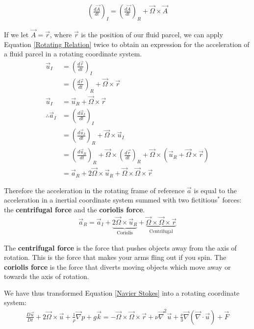 \begin{align}
    \left(\frac{d\vec{A}}{dt}\right)_I=\left(\frac{d\vec{A}}{dt}\right)_R+\vec{\Omega}\times\vec{A}
    \label{Rotating Relation}
\end{align}

If we let $\vec{A}=\vec{r}$, where $\vec{r}$ is the position of our fluid parcel, we can apply Equation \ref{Rotating Relation} twice to obtain an expression for the acceleration of a fluid parcel in a rotating coordinate system.
\begin{align*}
    \vec{u}_I &= \left( \frac{d\vec{r}}{dt} \right)_I\\
    &= \left( \frac{d\vec{r}}{dt} \right)_R+\vec{\Omega}\times \vec{r}\\
    \vec{u}_I & = \vec{u}_R+\vec{\Omega}\times \vec{r}\\
    \therefore \vec{a}_I & =
    \left( \frac{d\vec{u}_I}{dt} \right)_I\\
    &= \left( \frac{d\vec{u}_I}{dt} \right)_R+\vec{\Omega}\times \vec{u}_I\\
    &= \left( \frac{d\vec{u}_R}{dt} \right)_R
    +\vec{\Omega}\times\left( \frac{d\vec{r}}{dt} \right)_R
    +\vec{\Omega}\times\left( 
        \vec{u}_R+\vec{\Omega}\times \vec{r}
     \right)\\
    &=\vec{a}_R+2\vec{\Omega}\times\vec{u}_R+\vec{\Omega}\times\vec{\Omega}\times\vec{r}
\end{align*}

Therefore the acceleration in the rotating frame of reference $\vec{a}$ is equal to the acceleration in a inertial coordinate system summed with two fictitious\href{https://xkcd.com/123/}{$^*$}  forces: the \textbf{centrifugal force} and the \textbf{coriolis force}.
\begin{align}
    \vec{a}_R=\vec{a}_I+\underbrace{2\vec{\Omega}\times\vec{u}_R}_\text{Coriolis}
    +\underbrace{\vec{\Omega}\times\vec{\Omega}\times\vec{r}}_\text{Centrifugal}
\end{align}

The \textbf{centrifugal force} is the force that pushes objects away from the axis of rotation. This is the force that makes your arms fling out if you spin. The \textbf{coriolis force} is the force that diverts moving objects which move away or towards the axis of rotation. 

We have thus transformed Equation \ref{Navier Stokes} into a rotating coordinate system:
\begin{align}
    \frac{D\vec{u}}{Dt}+2\vec{\Omega}\times\vec{u}+\frac{1}{\rho}\vec{\nabla}p+g\vec{k}=-\vec{\Omega}\times\vec{\Omega}\times\vec{r}+\nu\vec{\nabla}^2\vec{u}+\frac{\nu}{3}\vec{\nabla}(\vec{\nabla}\cdot\vec{u})+\vec{F}\label{Navier Stokes Rotating}
\end{align}

